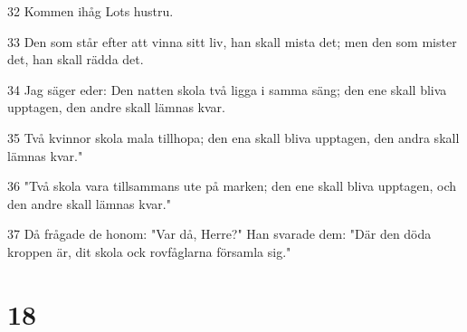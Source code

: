 \par 32 Kommen ihåg Lots hustru.
\par 33 Den som står efter att vinna sitt liv, han skall mista det; men den som mister det, han skall rädda det.
\par 34 Jag säger eder: Den natten skola två ligga i samma säng; den ene skall bliva upptagen, den andre skall lämnas kvar.
\par 35 Två kvinnor skola mala tillhopa; den ena skall bliva upptagen, den andra skall lämnas kvar."
\par 36 "Två skola vara tillsammans ute på marken; den ene skall bliva upptagen, och den andre skall lämnas kvar."
\par 37 Då frågade de honom: "Var då, Herre?" Han svarade dem: "Där den döda kroppen är, dit skola ock rovfåglarna församla sig."

\chapter{18}

